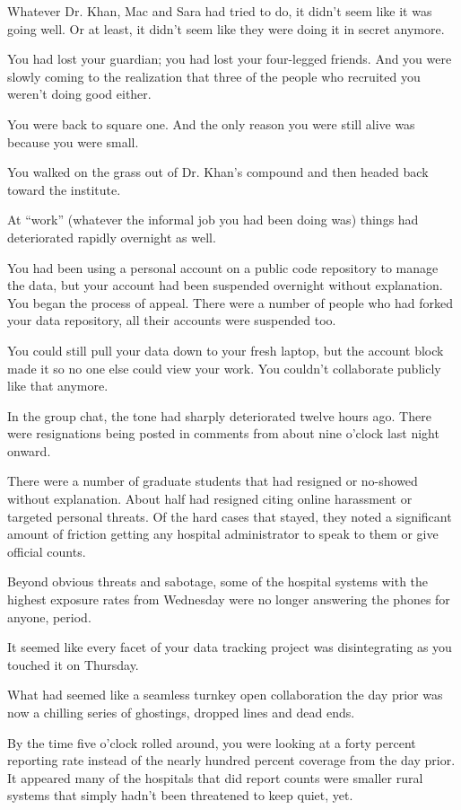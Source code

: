 \documentclass[17pt, twoside, a5paper, openright, extrafontsizes]{memoir}
\begin{document}
Whatever Dr. Khan, Mac and Sara had tried to do, it didn't seem like it
was going well. Or at least, it didn't seem like they were doing it in
secret anymore.

You had lost your guardian; you had lost your four-legged friends. And
you were slowly coming to the realization that three of the people who
recruited you weren't doing good either.

You were back to square one. And the only reason you were still alive
was because you were small.

You walked on the grass out of Dr. Khan's compound and then headed back
toward the institute.

At ``work'' (whatever the informal job you had been doing was) things
had deteriorated rapidly overnight as well.

You had been using a personal account on a public code repository to
manage the data, but your account had been suspended overnight without
explanation. You began the process of appeal. There were a number of
people who had forked your data repository, all their accounts were
suspended too.

You could still pull your data down to your fresh laptop, but the
account block made it so no one else could view your work. You couldn't
collaborate publicly like that anymore.

In the group chat, the tone had sharply deteriorated twelve hours ago.
There were resignations being posted in comments from about nine o'clock
last night onward.

There were a number of graduate students that had resigned or no-showed
without explanation. About half had resigned citing online harassment or
targeted personal threats. Of the hard cases that stayed, they noted a
significant amount of friction getting any hospital administrator to
speak to them or give official counts.

Beyond obvious threats and sabotage, some of the hospital systems with
the highest exposure rates from Wednesday were no longer answering the
phones for anyone, period.

It seemed like every facet of your data tracking project was
disintegrating as you touched it on Thursday.

What had seemed like a seamless turnkey open collaboration the day prior
was now a chilling series of ghostings, dropped lines and dead ends.

By the time five o'clock rolled around, you were looking at a forty
percent reporting rate instead of the nearly hundred percent coverage
from the day prior. It appeared many of the hospitals that did report
counts were smaller rural systems that simply hadn't been threatened to
keep quiet, yet.
\end{document}
